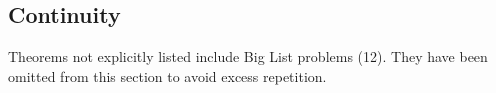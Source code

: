 \subsection{Continuity}
Theorems not explicitly listed include Big List problems (12).
They have been omitted from this section to avoid excess repetition.
